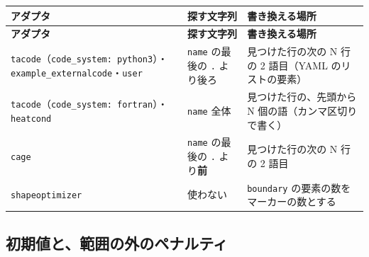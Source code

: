 \begingroup\small
\begin{longtable}{>{\raggedright\arraybackslash}p{}>{\raggedright\arraybackslash}p{}>{\raggedright\arraybackslash}p{}}
\toprule
\textbf{アダプタ} & \textbf{探す文字列} & \textbf{書き換える場所} \\
\midrule
\endfirsthead
\toprule
\textbf{アダプタ} & \textbf{探す文字列} & \textbf{書き換える場所} \\
\midrule
\endhead
\bottomrule
\endlastfoot
\texttt{tacode}（\texttt{code\_\allowbreak{}system: python3}）・\texttt{example\_\allowbreak{}externalcode}・\texttt{user} & \texttt{name} の最後の \texttt{.\allowbreak{}} より後ろ & 見つけた行の次の N 行の 2 語目（YAML のリストの要素） \\
\texttt{tacode}（\texttt{code\_\allowbreak{}system: fortran}）・\texttt{heatcond} & \texttt{name} 全体 & 見つけた行の、先頭から N 個の語（カンマ区切りで書く） \\
\texttt{cage} & \texttt{name} の最後の \texttt{.\allowbreak{}} より\textbf{前} & 見つけた行の次の N 行の 2 語目 \\
\texttt{shapeoptimizer} & 使わない & \texttt{boundary} の要素の数をマーカーの数とする \\
\end{longtable}
\endgroup

\subsection{初期値と、範囲の外のペナルティ}


